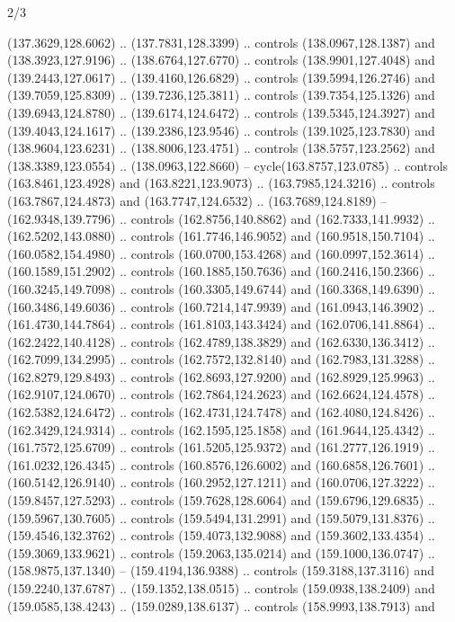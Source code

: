 \begin{flagdescription}{2/3}
\begin{scope}[shift={(0.5\flaglength,0.5)},scale=\flagwidth/320]
\begin{scope}[y=0.8pt, x=0.8pt, yscale=-1,shift={(-118.3,-146)}]
  (137.3629,128.6062) .. (137.7831,128.3399) .. controls (138.0967,128.1387) and
  (138.3923,127.9196) .. (138.6764,127.6770) .. controls (138.9901,127.4048) and
  (139.2443,127.0617) .. (139.4160,126.6829) .. controls (139.5994,126.2746) and
  (139.7059,125.8309) .. (139.7236,125.3811) .. controls (139.7354,125.1326) and
  (139.6943,124.8780) .. (139.6174,124.6472) .. controls (139.5345,124.3927) and
  (139.4043,124.1617) .. (139.2386,123.9546) .. controls (139.1025,123.7830) and
  (138.9604,123.6231) .. (138.8006,123.4751) .. controls (138.5757,123.2562) and
  (138.3389,123.0554) .. (138.0963,122.8660) -- cycle(163.8757,123.0785) ..
  controls (163.8461,123.4928) and (163.8221,123.9073) .. (163.7985,124.3216) ..
  controls (163.7867,124.4873) and (163.7747,124.6532) .. (163.7689,124.8189) --
  (162.9348,139.7796) .. controls (162.8756,140.8862) and (162.7333,141.9932) ..
  (162.5202,143.0880) .. controls (161.7746,146.9052) and (160.9518,150.7104) ..
  (160.0582,154.4980) .. controls (160.0700,153.4268) and (160.0997,152.3614) ..
  (160.1589,151.2902) .. controls (160.1885,150.7636) and (160.2416,150.2366) ..
  (160.3245,149.7098) .. controls (160.3305,149.6744) and (160.3368,149.6390) ..
  (160.3486,149.6036) .. controls (160.7214,147.9939) and (161.0943,146.3902) ..
  (161.4730,144.7864) .. controls (161.8103,143.3424) and (162.0706,141.8864) ..
  (162.2422,140.4128) .. controls (162.4789,138.3829) and (162.6330,136.3412) ..
  (162.7099,134.2995) .. controls (162.7572,132.8140) and (162.7983,131.3288) ..
  (162.8279,129.8493) .. controls (162.8693,127.9200) and (162.8929,125.9963) ..
  (162.9107,124.0670) .. controls (162.7864,124.2623) and (162.6624,124.4578) ..
  (162.5382,124.6472) .. controls (162.4731,124.7478) and (162.4080,124.8426) ..
  (162.3429,124.9314) .. controls (162.1595,125.1858) and (161.9644,125.4342) ..
  (161.7572,125.6709) .. controls (161.5205,125.9372) and (161.2777,126.1919) ..
  (161.0232,126.4345) .. controls (160.8576,126.6002) and (160.6858,126.7601) ..
  (160.5142,126.9140) .. controls (160.2952,127.1211) and (160.0706,127.3222) ..
  (159.8457,127.5293) .. controls (159.7628,128.6064) and (159.6796,129.6835) ..
  (159.5967,130.7605) .. controls (159.5494,131.2991) and (159.5079,131.8376) ..
  (159.4546,132.3762) .. controls (159.4073,132.9088) and (159.3602,133.4354) ..
  (159.3069,133.9621) .. controls (159.2063,135.0214) and (159.1000,136.0747) ..
  (158.9875,137.1340) -- (159.4194,136.9388) .. controls (159.3188,137.3116) and
  (159.2240,137.6787) .. (159.1352,138.0515) .. controls (159.0938,138.2409) and
  (159.0585,138.4243) .. (159.0289,138.6137) .. controls (158.9993,138.7913) and

\end{scope}
\end{scope}
\end{flagdescription}
